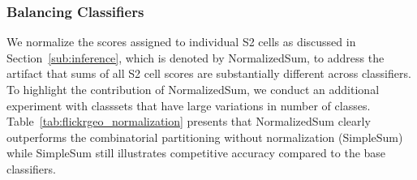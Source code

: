 \documentclass[runningheads]{llncs}
\begin{document}
\begin{table}[t]
\centering
\caption{Comparisons between the models with and without normalization for combinatorial partitioning on Im2GPS3k.
Each number in parentheses denotes the geoclass set size, which varies largely to highlight the effect of normalization for this experiment.}
\label{tab:flickrgeo_normalization}
\end{table}




\subsubsection{Balancing Classifiers}
We normalize the scores assigned to individual S2 cells as discussed in Section~\ref{sub:inference}, which is denoted by NormalizedSum, to address the artifact that sums of all S2 cell scores are substantially different across classifiers.
To highlight the contribution of NormalizedSum, we conduct an additional experiment with classsets that have large variations in number of classes.
Table~\ref{tab:flickrgeo_normalization} presents that NormalizedSum clearly outperforms the combinatorial partitioning without normalization (SimpleSum) while SimpleSum still illustrates competitive accuracy compared to the base classifiers.
\end{document}
